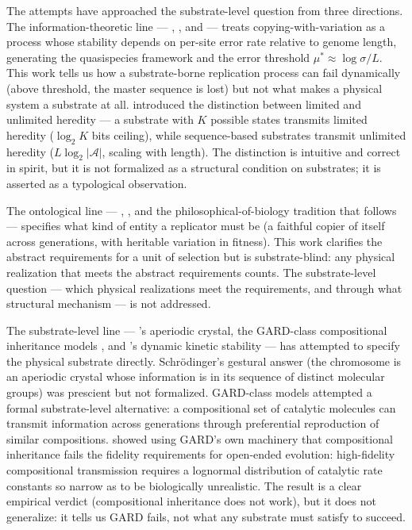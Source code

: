 \documentclass[aps,prx,reprint,amsmath,amssymb,floatfix,superscriptaddress,nofootinbib]{revtex4-2}
\theoremstyle{plain-thm}
\theoremstyle{definition-thm}
\begin{document}
The attempts have approached the substrate-level question from three directions. The information-theoretic line --- \citet{Eigen1971}, \citet{EigenMcCaskillSchuster1989}, and \citet{Szathmary2000} --- treats copying-with-variation as a process whose stability depends on per-site error rate relative to genome length, generating the quasispecies framework and the error threshold $\mu^* \approx \log \sigma / L$. This work tells us how a substrate-borne replication process can fail dynamically (above threshold, the master sequence is lost) but not what makes a physical system a substrate at all. \citet{Szathmary2000} introduced the distinction between limited and unlimited heredity --- a substrate with $K$ possible states transmits limited heredity ($\log_2 K$ bits ceiling), while sequence-based substrates transmit unlimited heredity ($L \log_2 |\mathcal{A}|$, scaling with length). The distinction is intuitive and correct in spirit, but it is not formalized as a structural condition on substrates; it is asserted as a typological observation.

The ontological line --- \citet{Hull1980}, \citet{MaynardSmith2000}, and the philosophical-of-biology tradition that follows --- specifies what kind of entity a replicator must be (a faithful copier of itself across generations, with heritable variation in fitness). This work clarifies the abstract requirements for a unit of selection but is substrate-blind: any physical realization that meets the abstract requirements counts. The substrate-level question --- which physical realizations meet the requirements, and through what structural mechanism --- is not addressed.

The substrate-level line --- \citet{Schrodinger1944}'s aperiodic crystal, the GARD-class compositional inheritance models \citep{Kauffman1986, Hordijk2012}, and \citet{Pross2011}'s dynamic kinetic stability --- has attempted to specify the physical substrate directly. Schr\"odinger's gestural answer (the chromosome is an aperiodic crystal whose information is in its sequence of distinct molecular groups) was prescient but not formalized. GARD-class models attempted a formal substrate-level alternative: a compositional set of catalytic molecules can transmit information across generations through preferential reproduction of similar compositions. \citet{Vasas2010} showed using GARD's own machinery that compositional inheritance fails the fidelity requirements for open-ended evolution: high-fidelity compositional transmission requires a lognormal distribution of catalytic rate constants so narrow as to be biologically unrealistic. The result is a clear empirical verdict (compositional inheritance does not work), but it does not generalize: it tells us GARD fails, not what any substrate must satisfy to succeed.
\end{document}
